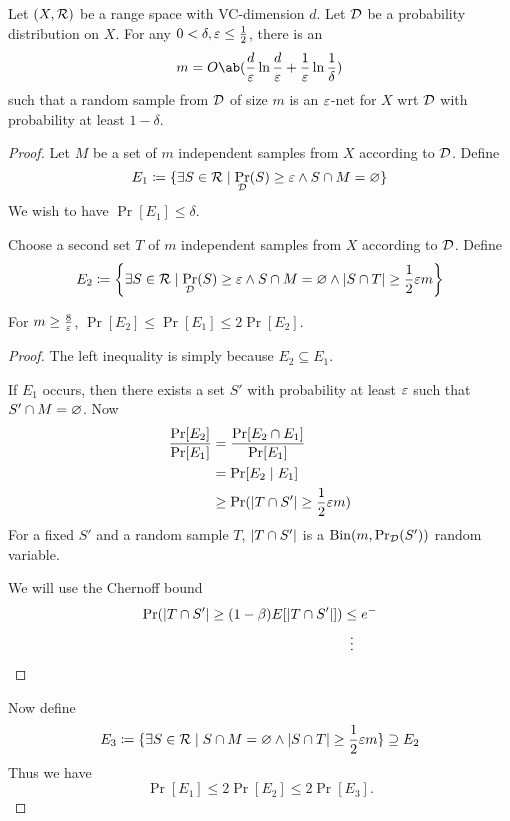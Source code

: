 \begin{theorem*} \label{thm:eps-nets}
    Let $(X, \mathcal{R})$ be a range space with VC-dimension $d$.
    Let $\mathcal{D}$ be a probability distribution on $X$.
    For any $0 < \delta, \varepsilon \le \frac12$,
    there is an \[
        m = O\ab(\frac{d}{\eps} \ln \frac{d}{\eps} + \frac1{\eps} \ln \frac1{\delta})
    \] such that a random sample from $\mathcal{D}$ of size $m$ is an $\varepsilon$-net
    for $X$ wrt $\mathcal{D}$ with probability at least $1 - \delta$.
\end{theorem*}
\begin{proof}
    Let $M$ be a set of $m$ independent samples from $X$ according to
    $\mathcal{D}$.
    Define \[
        E_1 \coloneq \{\exists S \in \mathcal{R} \mid \Pr_{\mathcal{D}}(S) \ge \varepsilon
                    \land S \cap M = \varnothing\}
    \] We wish to have $\Pr[E_1] \le \delta$.

    Choose a second set $T$ of $m$ independent samples from $X$ according to
    $\mathcal{D}$.
    Define \[
        E_2 \coloneq \set*{\exists S \in \mcR \mid \Pr_\mcD(S) \ge \eps
            \land S \cap M = \O \land \abs{S \cap T} \ge \frac12 \eps m}
    \]
    \begin{lemma}
        For $m \ge \frac{8}{\varepsilon}$, $\Pr[E_2] \le \Pr[E_1] \le 2 \Pr[E_2]$.
    \end{lemma}
    \begin{proof}
        The left inequality is simply because $E_2 \subseteq E_1$.

        If $E_1$ occurs, then there exists a set $S'$ with probability
        at least $\varepsilon$ such that $S' \cap M = \varnothing$.
        Now \begin{align*}
            \frac{\Pr[E_2]}{\Pr[E_1]} &= \frac{\Pr[E_2 \cap E_1]}{\Pr[E_1]} \\
            &= \Pr[E_2 \mid E_1] \\
            &\ge \Pr(\lvert T \cap S'\rvert \ge \frac12 \varepsilon m)
        \end{align*}
        For a fixed $S'$ and a random sample $T$, $\lvert T \cap S'\rvert$ is
        a $\operatorname{Bin}(m, \Pr_{\mathcal{D}}(S'))$ random variable.

        We will use the Chernoff bound
        \begin{align*}
            \Pr(\abs{T \cap S'} \ge (1 - \beta) E[\abs{T \cap S'}])
            &\le e^{-} \\
            &\vdotswithin{\le}
        \end{align*}
    \end{proof}
    Now define \[
        E_3 \coloneq \{\exists S \in \mathcal{R} \mid
            S \cap M = \varnothing \land \lvert S \cap T\rvert \ge \frac12 \varepsilon m\}
            \supseteq E_2
    \] Thus we have \[
        \Pr[E_1] \le 2 \Pr[E_2] \le 2 \Pr[E_3].
    \]


\end{proof}
